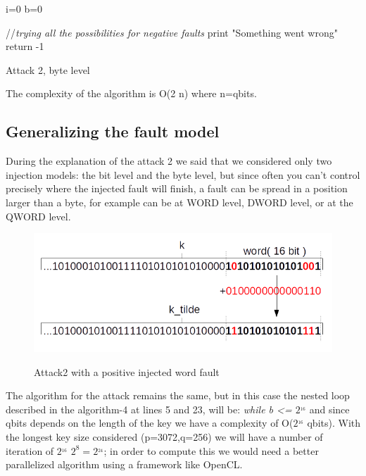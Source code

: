 \documentclass[11pt,english]{article}
\begin{document}
\begin{itemize}
\begin{algorithm}[H]
  i=0\;  
  b=0\;
  
  //\textit{trying all the possibilities for negative faults}\;
  print "Something went wrong"\;
  return -1

  \caption{Attack 2, byte level}
\end{algorithm}
\end{itemize}

The complexity of the algorithm is O(2  \cdot n) where n=qbits.

\subsection{Generalizing the fault model}
During the explanation of the attack 2 we said that we considered only two injection models: the bit level and the byte level, but since often you can't control precisely where the injected fault will finish, a fault can be spread in a position larger than a byte, for example can be at WORD level, DWORD level, or at the QWORD level. 

\begin{figure}[H]
\includegraphics[width=1.0\textwidth]{img/attack2word.png} \\
\caption{\label{f_etichetta}Attack2 with a positive injected word fault }
\end{figure}

The algorithm for the attack remains the same, but in this case the nested loop described in the algorithm-4 at lines 5 and 23, will be: \textit{while b <= $2^_{16}$} and since qbits depends on the length of the key we have a complexity of O($2^_{16}$ \cdot qbits). With the longest key size considered (p=3072,q=256) we will have a number of iteration of $2^_{16}$ \cdot $2^{8} = 2^_{24}$; in order to compute this we would need a better parallelized algorithm using a framework like OpenCL\cite{opencl}.
\end{document}
